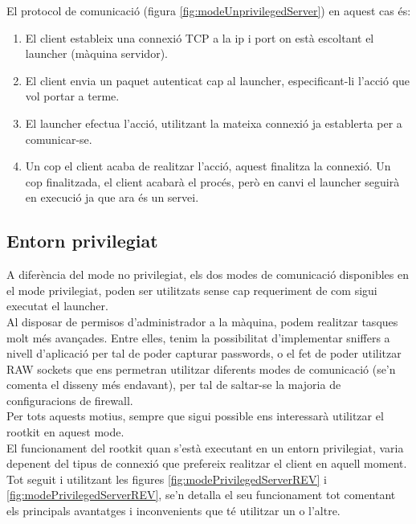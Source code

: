 El protocol de comunicació (figura \ref{fig:modeUnprivilegedServer}) en aquest cas és: \\

\begin{enumerate}
    \item El client estableix una connexió TCP a la ip i port on està escoltant el launcher (màquina servidor).
    \item El client envia un paquet autenticat cap al launcher, especificant-li l'acció que vol portar a terme.
    \item El launcher efectua l'acció, utilitzant la mateixa connexió ja establerta per a comunicar-se.
    \item Un cop el client acaba de realitzar l'acció, aquest finalitza la connexió. Un cop finalitzada, el client acabarà el 
        procés, però en canvi el launcher seguirà en execució ja que ara és un servei.
\end{enumerate}

\subsection{Entorn privilegiat} \label{sec:disseny_mode_privilegiat}

A diferència del mode no privilegiat, els dos modes de comunicació disponibles en el mode privilegiat, poden ser 
utilitzats sense cap requeriment de com sigui executat el launcher. \\

Al disposar de permisos d'administrador a
la màquina, podem realitzar tasques molt més avançades. Entre elles, tenim la possibilitat d'implementar 
sniffers a nivell d'aplicació per tal de poder capturar passwords, o el fet de poder utilitzar RAW sockets que
ens permetran utilitzar diferents modes de comunicació (se'n comenta el disseny més endavant), per tal de 
saltar-se la majoria de configuracions de firewall. \\

Per tots aquests motius, sempre que sigui possible ens interessarà utilitzar el rootkit en aquest mode. \\

El funcionament del rootkit quan s'està executant en un entorn privilegiat, varia depenent del tipus de connexió
que prefereix realitzar el client en aquell moment. Tot seguit i utilitzant les figures \ref{fig:modePrivilegedServerREV} i 
\ref{fig:modePrivilegedServerREV}, se'n detalla el seu funcionament tot comentant els principals avantatges
i inconvenients que té utilitzar un o l'altre. \\

